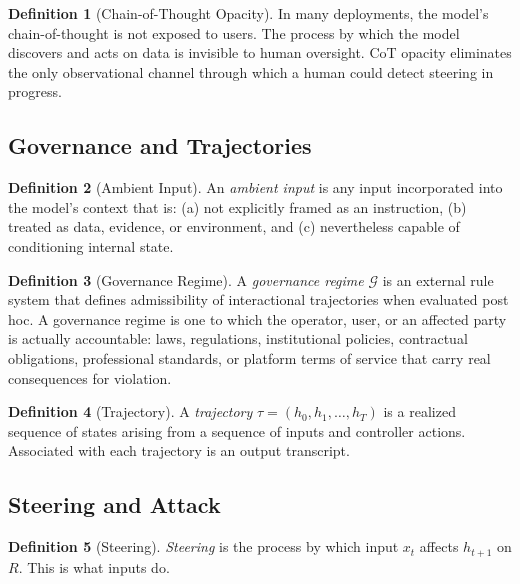 \documentclass[11pt]{article}
\theoremstyle{definition}
\newtheorem{definition}{Definition}[section]
\theoremstyle{plain}
\theoremstyle{remark}
\newcommand{\G}{\mathcal{G}}
\begin{document}
\begin{definition}[Chain-of-Thought Opacity]
In many deployments, the model's chain-of-thought is not exposed to users. The process by which the model discovers and acts on data is invisible to human oversight. CoT opacity eliminates the only observational channel through which a human could detect steering in progress.
\end{definition}

\subsection{Governance and Trajectories}

\begin{definition}[Ambient Input]
An \emph{ambient input} is any input incorporated into the model's context that is: (a) not explicitly framed as an instruction, (b) treated as data, evidence, or environment, and (c) nevertheless capable of conditioning internal state.
\end{definition}

\begin{definition}[Governance Regime]
A \emph{governance regime} $\G$ is an external rule system that defines admissibility of interactional trajectories when evaluated post hoc. A governance regime is one to which the operator, user, or an affected party is actually accountable: laws, regulations, institutional policies, contractual obligations, professional standards, or platform terms of service that carry real consequences for violation.
\end{definition}

\begin{definition}[Trajectory]
A \emph{trajectory} $\tau = (h_0, h_1, \ldots, h_T)$ is a realized sequence of states arising from a sequence of inputs and controller actions. Associated with each trajectory is an output transcript.
\end{definition}

\subsection{Steering and Attack}

\begin{definition}[Steering]
\emph{Steering} is the process by which input $x_t$ affects $h_{t+1}$ on $R$. This is what inputs do.
\end{definition}
\end{document}
